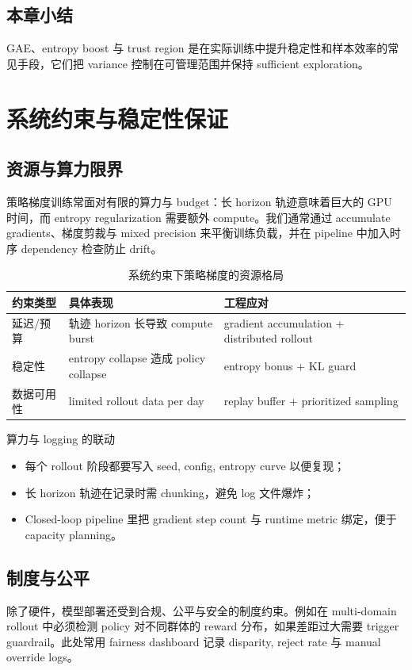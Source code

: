 \documentclass[a4paper]{article}
\begin{document}
\subsection{本章小结}
GAE、entropy boost 与 trust region 是在实际训练中提升稳定性和样本效率的常见手段，它们把 variance 控制在可管理范围并保持 sufficient exploration。

\section{系统约束与稳定性保证}
\subsection{资源与算力限界}
策略梯度训练常面对有限的算力与 budget：长 horizon 轨迹意味着巨大的 GPU 时间，而 entropy regularization 需要额外 compute。我们通常通过 accumulate gradients、梯度剪裁与 mixed precision 来平衡训练负载，并在 pipeline 中加入时序 dependency 检查防止 drift。

\begin{table}[H]
\centering
\small
\begin{tabular}{p{}p{}p{}}
\toprule
约束类型 & 具体表现 & 工程应对 \\
\midrule
延迟/预算 & 轨迹 horizon 长导致 compute burst & gradient accumulation + distributed rollout \\
稳定性 & entropy collapse 造成 policy collapse & entropy bonus + KL guard \\
数据可用性 & limited rollout data per day & replay buffer + prioritized sampling \\
\bottomrule
\end{tabular}
\caption{系统约束下策略梯度的资源格局}
\end{table}

\begin{importantbox}{算力与 logging 的联动}
\begin{itemize}
    \item 每个 rollout 阶段都要写入 seed, config, entropy curve 以便复现；
    \item 长 horizon 轨迹在记录时需 chunking，避免 log 文件爆炸；
    \item Closed-loop pipeline 里把 gradient step count 与 runtime metric 绑定，便于 capacity planning。
\end{itemize}
\end{importantbox}

\subsection{制度与公平}
除了硬件，模型部署还受到合规、公平与安全的制度约束。例如在 multi-domain rollout 中必须检测 policy 对不同群体的 reward 分布，如果差距过大需要 trigger guardrail。此处常用 fairness dashboard 记录 disparity, reject rate 与 manual override logs。
\end{document}
